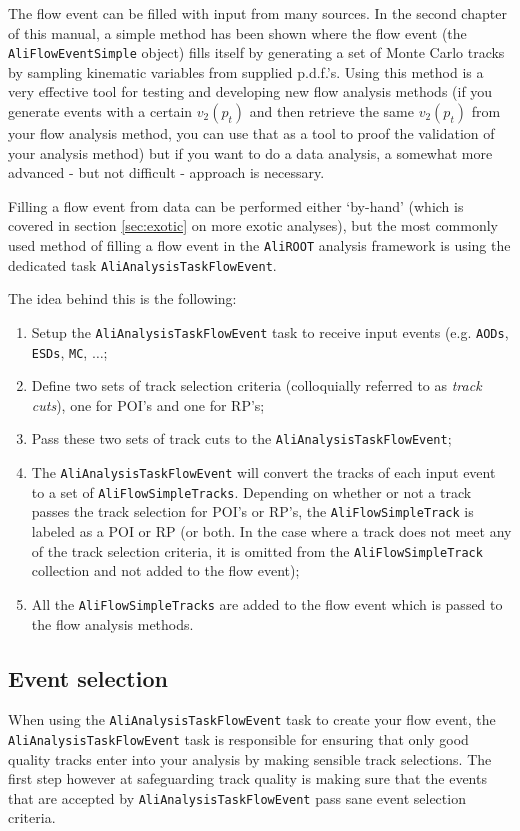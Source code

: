 \documentclass[a4paper]{book}
\numberwithin{equation}{subsection}
\begin{document}
The flow event can be filled with input from many sources. In the second chapter of this manual, a simple method has been shown where the flow event (the \texttt{AliFlowEventSimple} object) fills itself by generating a set of Monte Carlo tracks by sampling kinematic variables from supplied p.d.f.'s. Using this method is a very effective tool for testing and developing new flow analysis methods (if you generate events with a certain $v_2(p_t)$ and then retrieve the same $v_2(p_t)$ from your flow analysis method, you can use that as a tool to proof the validation of your analysis method) but if you want to do a data analysis, a somewhat more advanced - but not difficult - approach is necessary. 

Filling a flow event from data can be performed either `by-hand' (which is covered in section \ref{sec:exotic} on more exotic analyses), but the most commonly used method of filling a flow event in the \texttt{AliROOT} analysis framework is using the dedicated task \texttt{AliAnalysisTaskFlowEvent}. 

The idea behind this is the following:
\begin{enumerate}
\item Setup the \texttt{AliAnalysisTaskFlowEvent} task to receive input events (e.g. \texttt{AODs}, \texttt{ESDs}, \texttt{MC}, $\ldots$;
\item Define two sets of track selection criteria (colloquially referred to as \emph{track cuts}), one for POI's and one for RP's;
\item Pass these two sets of track cuts to the \texttt{AliAnalysisTaskFlowEvent};
\item The \texttt{AliAnalysisTaskFlowEvent} will convert the tracks  of each input event to a set of \texttt{AliFlowSimpleTracks}. Depending on whether or not a track passes the track selection for POI's or RP's, the \texttt{AliFlowSimpleTrack} is labeled as a POI or RP (or both. In the case where a track does not meet any of the track selection criteria, it is omitted from the \texttt{AliFlowSimpleTrack} collection and not added to the flow event);
\item All the \texttt{AliFlowSimpleTracks} are added to the flow event which is passed to the flow analysis methods. 
\end{enumerate}

\subsection{Event selection}
When using the \texttt{AliAnalysisTaskFlowEvent} task to create your flow event, the \texttt{AliAnalysisTaskFlowEvent} task is responsible for ensuring that only good quality tracks enter into your analysis by making sensible track selections. The first step however at safeguarding track quality is making sure that the events that are accepted by \texttt{AliAnalysisTaskFlowEvent} pass sane event selection criteria. 
\end{document}
